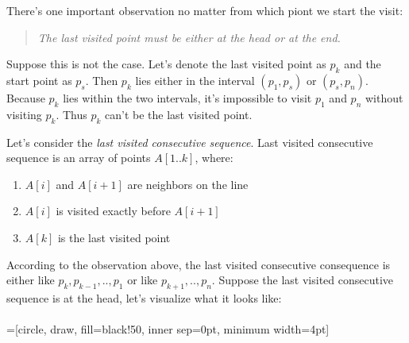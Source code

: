 
There's one important observation no matter from which piont we start the visit:

\begin{quote}
\textit{The last visited point must be either at the head or at the end.}
\end{quote}

Suppose this is not the case. Let's denote the last visited point as $p_k$ and the start point as $p_s$. Then $p_k$ lies either in the interval $(p_1, p_s)$ or $(p_s, p_n)$. Because $p_k$ lies within the two intervals, it's impossible to visit $p_1$ and $p_n$ without visiting $p_k$. Thus $p_k$ can't be the last visited point.

Let's consider the \textit{last visited consecutive sequence}. Last visited consecutive sequence is an array of points $A[1..k]$, where:

\begin{enumerate}
\item $A[i]$ and $A[i+1]$ are neighbors on the line
\item $A[i]$ is visited exactly before $A[i+1]$
\item $A[k]$ is the last visited point
\end{enumerate}

According to the observation above, the last visited consecutive consequence is either like $p_k, p_{k-1}, .., p_1$ or like $p_{k+1}, .., p_n$. Suppose the last visited consecutive sequence is at the head, let's visualize what it looks like:\\\\

=[circle, draw, fill=black!50,
                        inner sep=0pt, minimum width=4pt]
\quad

